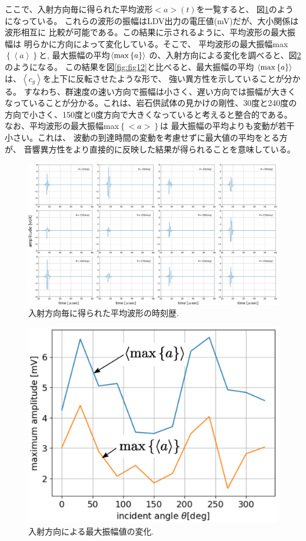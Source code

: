 ここで、入射方向毎に得られた平均波形$<a>(t)$を一覧すると、
図\ref{fig:fig11_1}のようになっている。
これらの波形の振幅はLDV出力の電圧値(mV)だが、大小関係は波形相互に
比較が可能である。この結果に示されるように、平均波形の最大振幅は
明らかに方向によって変化している。そこで、
平均波形の最大振幅max$\left\{ \left< a \right>\right\}$と,
最大振幅の平均$\left< {\rm max}\left\{ a \right\} \right>$
の、入射方向による変化を調べると、図\ref{fig:fig14}のようになる。
この結果を図\ref{fig:fig12}と比べると、最大振幅の平均
$\left<{\rm max}\left\{a\right\}\right>$
は、$\left<c_g\right>$を上下に反転させたような形で、
強い異方性を示していることが分かる。
すなわち、群速度の速い方向で振幅は小さく、遅い方向では振幅が大きく
なっていることが分かる。これは、岩石供試体の見かけの剛性、30度と240度の
方向で小さく、150度と0度方向で大きくなっていると考えると整合的である。
なお、平均波形の最大振幅max$\left\{<a>\right\}$は
最大振幅の平均よりも変動が若干小さい。これは、
波動の到達時間の変動を考慮せずに最大値の平均をとる方が、
音響異方性をより直接的に反映した結果が得られることを意味している。
\begin{figure}[h]
	\begin{center}
	\includegraphics[width=1.0\linewidth]{Figs/fig11_1.eps} 
	\end{center}
	\caption{
		入射方向毎に得られた平均波形の時刻歴.
	} 
	\label{fig:fig11_1}
\end{figure}
\begin{figure}[h]
	\begin{center}
	\includegraphics[width=0.8\linewidth]{Figs/fig14.eps} 
	\end{center}
	\caption{
		入射方向による最大振幅値の変化.
	} 
	\label{fig:fig14}
\end{figure}
